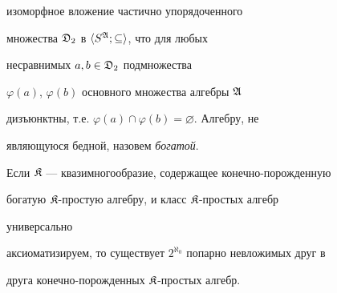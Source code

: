 изоморфное вложение частично упорядоченного


множества $\frak D_2$ в $\langle S^{\frak A};\subseteq\rangle$, что для любых


несравнимых $a,b\in\frak D_2$ подмножества


$\varphi(a)$, $\varphi(b)$ основного множества алгебры $\frak A$


дизъюнктны, т.е. $\varphi(a)\cap\varphi(b)=\varnothing$. Алгебру, не


являющуюся бедной, назовем {\it богатой}.





\begin{thm}


Если $\frak K$ --- квазимногообразие, содержащее конечно-порожденную


богатую $\frak K$-простую алгебру, и класс $\frak K$-простых алгебр


универсально


аксиоматизируем, то существует $2^{\aleph_0}$ попарно невложимых друг в


друга конечно-порожденных $\frak K$-простых алгебр.


\end{thm}





